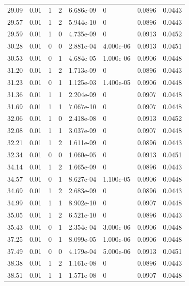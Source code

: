 \documentclass[preview]{standalone}
\begin{document}
{{{\begin{tabular}{L{1.2cm}C{1.2cm} C{0.3cm}C{0.5cm} C{1.4cm}C{1.4cm} C{1.4cm}C{1.4cm}}
  29.09  &  0.01  & 1     &  2 &  6.686e-09  & 0  & 0.0896 &  0.0443   \\ 
  29.57  &  0.01  & 1     &  2 &  5.944e-10  & 0  & 0.0896 &  0.0443   \\ 
  29.59  &  0.01  & 1     &  0 &  4.735e-09  & 0  & 0.0913 &  0.0452   \\ 
  30.28  &  0.01  & 0     &  0 &  2.881e-04  & 4.000e-06  & 0.0913 &  0.0451   \\ 
  30.53  &  0.01  & 0     &  1 &  4.684e-05  & 1.000e-06  & 0.0906 &  0.0448   \\ 
  31.20  &  0.01  & 1     &  2 &  1.713e-09  & 0  & 0.0896 &  0.0443   \\ 
  31.23  &  0.01  & 0     &  1 &  1.125e-03  & 1.400e-05  & 0.0906 &  0.0448   \\ 
  31.36  &  0.01  & 1     &  1 &  2.204e-09  & 0  & 0.0907 &  0.0448   \\ 
  31.69  &  0.01  & 1     &  1 &  7.067e-10  & 0  & 0.0907 &  0.0448   \\ 
  32.06  &  0.01  & 1     &  0 &  2.418e-08  & 0  & 0.0913 &  0.0452   \\ 
  32.08  &  0.01  & 1     &  1 &  3.037e-09  & 0  & 0.0907 &  0.0448   \\ 
  32.21  &  0.01  & 1     &  2 &  1.611e-09  & 0  & 0.0896 &  0.0443   \\ 
  32.34  &  0.01  & 0     &  0 &  1.060e-05  & 0  & 0.0913 &  0.0451   \\ 
  34.14  &  0.01  & 1     &  2 &  1.665e-09  & 0  & 0.0896 &  0.0443   \\ 
  34.57  &  0.01  & 0     &  1 &  8.627e-04  & 1.100e-05  & 0.0906 &  0.0448   \\ 
  34.69  &  0.01  & 1     &  2 &  2.683e-09  & 0  & 0.0896 &  0.0443   \\ 
  34.99  &  0.01  & 1     &  1 &  8.902e-10  & 0  & 0.0907 &  0.0448   \\ 
  35.05  &  0.01  & 1     &  2 &  6.521e-10  & 0  & 0.0896 &  0.0443   \\ 
  35.43  &  0.01  & 0     &  1 &  2.354e-04  & 3.000e-06  & 0.0906 &  0.0448   \\ 
  37.25  &  0.01  & 0     &  1 &  8.099e-05  & 1.000e-06  & 0.0906 &  0.0448   \\ 
  37.49  &  0.01  & 0     &  0 &  4.179e-04  & 5.000e-06  & 0.0913 &  0.0451   \\ 
  38.38  &  0.01  & 1     &  2 &  1.161e-08  & 0  & 0.0896 &  0.0443   \\ 
  38.51  &  0.01  & 1     &  1 &  1.571e-08  & 0  & 0.0907 &  0.0448   \\ 

\end{tabular}}}}
\end{document}
